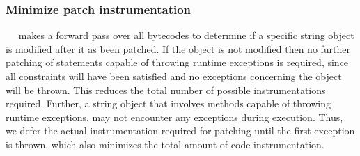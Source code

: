 \subsubsection{Minimize patch instrumentation}
\label{subsubsec:minimizePatchInstrumentation}
~\newline
\tool\ makes a forward pass over all bytecodes to determine if a specific string
object is modified after it as been patched. If the object is not modified then
no further patching of statements capable of throwing runtime exceptions is
required, since all constraints will have been satisfied and no exceptions
concerning the object will be thrown. This reduces the total number of possible
instrumentations required. Further, a string object that involves methods
capable of throwing runtime exceptions, may not encounter any exceptions during
execution. Thus, we defer the actual instrumentation required for patching until
the first exception is thrown, which also minimizes the total amount of code
instrumentation.
